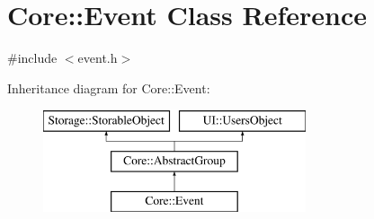 \hypertarget{classCore_1_1Event}{
\section{Core::Event Class Reference}
\label{d9/d42/classCore_1_1Event}
}


{\ttfamily \#include $<$event.h$>$}

Inheritance diagram for Core::Event:\begin{figure}[H]
\begin{center}
\leavevmode
\includegraphics[height=3.000000cm]{d9/d42/classCore_1_1Event}
\end{center}
\end{figure}
